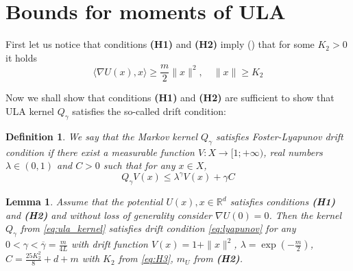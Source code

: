 \documentclass[bj]{imsart}
\newcommand{\ps}[2]{\langle #1, #2 \rangle}
\newtheorem{definition}{Definition}
\newtheorem{lem}[thm]{Lemma}
\begin{document}
\appendix
\section{Bounds for moments of  ULA}\label{sec:appendix}
First let us notice that conditions {\bf (H1)} and {\bf (H2)} imply (\cite[Lemma~16]{brosse2018diffusion}) that for some $K_2 > 0$ it holds
\begin{equation}
\label{eq:H3}
\ps{\nabla U(x)}{x} \geq \frac{m}{2}\|x\|^2, \quad \|x\| \geq K_2
\end{equation}

Now we shall show that conditions {\bf (H1)} and {\bf (H2)} are sufficient to show that ULA kernel $Q_\gamma$ satisfies the so-called drift condition:
\begin{definition}
\label{def:drift}
We say that the Markov kernel $Q_{\gamma}$ satisfies Foster-Lyapunov drift condition if there exist a measurable function $V: X \rightarrow [1; +\infty)$, real numbers $\lambda \in (0,1)$ and $C > 0$ such that for any $x \in X$,
\begin{equation}
\label{eq:lyapunov}
Q_{\gamma}V(x) \leq \lambda^{\gamma} V(x) + \gamma C
\end{equation}
\end{definition}

\begin{lem}
\label{lem:drift}
 Assume that the potential $U(x), x \in \mathbb{R}^d$ satisfies conditions {\bf (H1)} and {\bf (H2)} and without loss of generality consider $\nabla U(0) = 0$. Then the kernel $Q_\gamma$ from \eqref{eq:ula_kernel} satisfies drift condition \eqref{eq:lyapunov} for any $0 < \gamma < \overline{\gamma} = \frac{m}{4L}$ with drift function $V(x) = 1 + \|x\|^2$,   $\lambda = \exp{\left(-\frac{m}{2}\right)}$, $C = \frac{25K_2^2}{8} + d + m$ with $K_2$ from \eqref{eq:H3}, $m_U$ from {\bf (H2)}.
\end{lem}
\end{document}
